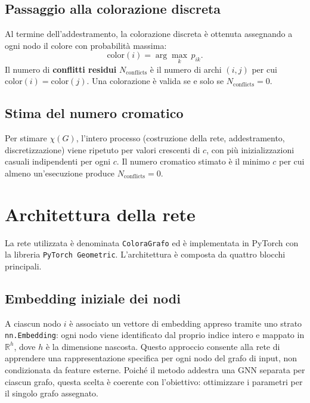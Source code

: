 \documentclass[11pt, a4paper]{article}
\begin{document}
\subsection*{Passaggio alla colorazione discreta}

Al termine dell'addestramento, la colorazione discreta è ottenuta assegnando a ogni nodo
il colore con probabilità massima:
\begin{equation}
    \mathrm{color}(i) = \arg\max_k\, p_{ik}.
\end{equation}
Il numero di \textbf{conflitti residui} $N_{\mathrm{conflicts}}$ è il numero di archi
$(i,j)$ per cui $\mathrm{color}(i) = \mathrm{color}(j)$. Una colorazione è valida se e
solo se $N_{\mathrm{conflicts}} = 0$.

\subsection*{Stima del numero cromatico}

Per stimare $\chi(G)$, l'intero processo (costruzione della rete, addestramento,
discretizzazione) viene ripetuto per valori crescenti di $c$, con più inizializzazioni
casuali indipendenti per ogni $c$. Il numero cromatico stimato è il minimo $c$ per cui
almeno un'esecuzione produce $N_{\mathrm{conflicts}} = 0$.

\section{Architettura della rete}

La rete utilizzata è denominata \texttt{ColoraGrafo} ed è implementata in PyTorch con la
libreria \texttt{PyTorch Geometric}. L'architettura è composta da quattro blocchi
principali.

\subsection*{Embedding iniziale dei nodi}

A ciascun nodo $i$ è associato un vettore di embedding appreso tramite uno strato
\texttt{nn.Embedding}: ogni nodo viene identificato dal proprio indice intero e mappato in
$\mathbb{R}^h$, dove $h$ è la dimensione nascosta. Questo approccio consente alla rete di
apprendere una rappresentazione specifica per ogni nodo del grafo di input, non condizionata
da feature esterne. Poiché il metodo addestra una GNN separata per ciascun grafo, questa
scelta è coerente con l'obiettivo: ottimizzare i parametri per il singolo grafo assegnato.
\end{document}
